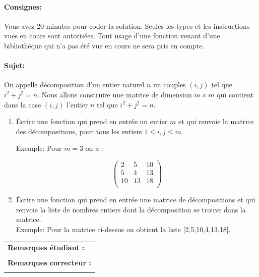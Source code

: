 \documentclass[a4paper,11pt]{article}
\begin{document}
\paragraph*{Consignes:} Vous avez 20 minutes pour coder la solution. Seules les types et les instructions vues en cours sont autorisées. Tout usage d'une fonction 
venant d'une bibliothèque qui n'a pas été vue en cours ne sera pris en compte. 



\paragraph*{Sujet:}


On appelle décomposition d’un entier naturel $n$ un  couples $(i, j)$ tel que $i^{2} + j^{2} = n$. Nous allons construire une matrice de dimension $m\times m$ qui contient dans la case $(i,j)$ l'entier $n$ tel que $i^{2} + j^{2} = n$. 


\begin{enumerate}


\item[1.] Écrire une fonction qui prend en entrée un entier $m$ et qui renvoie la matrice des décompositions, pour tous les entiers $1\leq i,j\leq m$. 

Exemple: Pour $m=3$ on a : 

$$
\begin{pmatrix}
2&5&10\\
5&4&13\\
10&13&18\\
\end{pmatrix}$$


\item[2.] \'Ecrire une fonction qui prend en entrée une matrice de décompositions et qui renvoie la liste de nombres entiers dont la décomposition se trouve dans la matrice. \\

Exemple: Pour la matrice ci-dessus on obtient la liste [2,5,10,4,13,18]. 

\end{enumerate}

\vspace{0.5 cm}
\begin{table}[h!]
\centering
\renewcommand{\arraystretch}{1.4} %
\begin{tabular}{|p{15cm}|}
\hline
\textbf{Remarques étudiant :}    \\
 \\
\hline
\textbf{Remarques correcteur :}  \\
 \\
\hline
\end{tabular}
\end{table}
\end{document}
